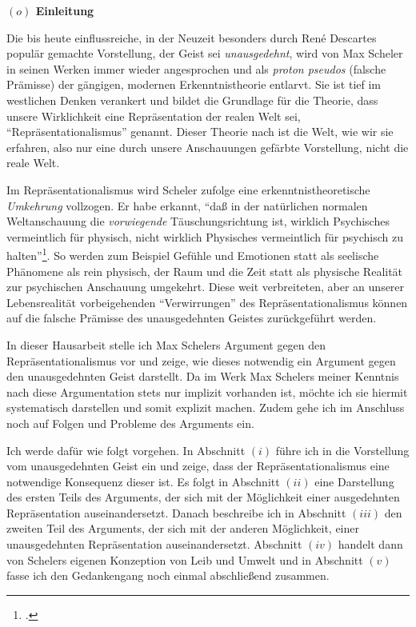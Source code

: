 \documentclass[a4paper, 12pt]{article}
\begin{document}
\begin{onehalfspace} 

\noindent\textbf{$(o)$ Einleitung}

\noindent Die bis heute einflussreiche, in der Neuzeit besonders durch Ren\'e Descartes populär gemachte Vorstellung, der Geist sei \emph{unausgedehnt}, wird von Max Scheler in seinen Werken immer wieder angesprochen und als \emph{proton pseudos} (falsche Prämisse) der gängigen, modernen Erkenntnistheorie entlarvt. Sie ist tief im westlichen Denken verankert und bildet die Grundlage für die Theorie, dass unsere Wirklichkeit eine Repräsentation der realen Welt sei, "`Repräsentationalismus"' genannt. Dieser Theorie nach ist die Welt, wie wir sie erfahren, also nur eine durch unsere Anschauungen gefärbte Vorstellung, nicht die reale Welt.

Im Repräsentationalismus wird Scheler zufolge eine erkenntnistheoretische \emph{Umkehrung} vollzogen. Er habe erkannt, "`daß in der natürlichen normalen Weltanschauung die \emph{vorwiegende} Täuschungsrichtung ist, wirklich Psychisches vermeintlich für physisch, nicht wirklich Physisches vermeintlich für psychisch zu halten"'\footnote{\Cite[Siehe][S. 257]{scheler-idole}.}. So werden zum Beispiel Gefühle und Emotionen statt als seelische Phänomene als rein physisch, der Raum und die Zeit statt als physische Realität zur psychischen Anschauung umgekehrt. Diese weit verbreiteten, aber an unserer Lebensrealität vorbeigehenden "`Verwirrungen"' des Repräsentationalismus können auf die falsche Prämisse des unausgedehnten Geistes zurück\-geführt werden. 

In dieser Hausarbeit stelle ich Max Schelers Argument gegen den Repräsentationalismus vor und zeige, wie dieses notwendig ein Argument gegen den unausgedehnten Geist darstellt. Da im Werk Max Schelers meiner Kenntnis nach diese Argumentation stets nur implizit vorhanden ist, möchte ich sie hiermit systematisch darstellen und somit explizit machen. Zudem gehe ich im Anschluss noch auf Folgen und Probleme des Arguments ein. 

\vspace{3mm}

Ich werde dafür wie folgt vorgehen. In Abschnitt $(i)$ führe ich in die Vorstellung vom unausgedehnten Geist ein und zeige, dass der Repräsentationalismus eine notwendige Konsequenz dieser ist. Es folgt in Abschnitt $(ii)$ eine Darstellung des ersten Teils des Arguments, der sich mit der Möglichkeit einer ausgedehnten Repräsentation auseinandersetzt. Danach beschreibe ich in Abschnitt $(iii)$ den zweiten Teil des Arguments, der sich mit der anderen Möglichkeit, einer unausgedehnten Repräsentation auseinandersetzt. Abschnitt $(iv)$ handelt dann von Schelers eigenen Konzeption von Leib und Umwelt und in Abschnitt $(v)$ fasse ich den Gedankengang noch einmal abschließend zusammen.


\end{onehalfspace}
\end{document}
